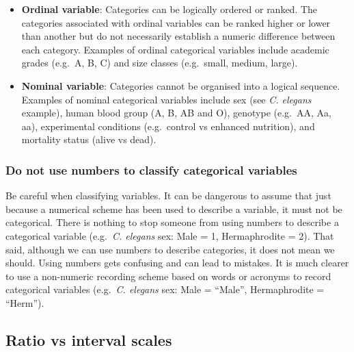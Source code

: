 \documentclass[
]{book}
\newenvironment{greybox}{
  \definecolor{shadecolor}{rgb}{0.95,0.95,0.95}  %
  \color{black}
  \begin{shaded}}
 {\end{shaded}}
\newenvironment{infobox}[1]
  {
  \begin{itemize}
  \renewcommand{\labelitemi}{
    \raisebox{-.7\height}[0pt][0pt]{
      {\setkeys{Gin}{width=3em,keepaspectratio}
        \texttt{[image: images/\#1]}}
    }
  }
  \setlength{\fboxsep}{1em}
  \begin{greybox}
  \item
  }
  {
  \end{greybox}
  \end{itemize}
  }
\begin{document}
\begin{itemize}
\item
  \textbf{Ordinal variable}: Categories can be logically ordered or ranked. The categories associated with ordinal variables can be ranked higher or lower than another but do not necessarily establish a numeric difference between each category. Examples of ordinal categorical variables include academic grades (e.g.~A, B, C) and size classes (e.g.~small, medium, large).
\item
  \textbf{Nominal variable}: Categories cannot be organised into a logical sequence. Examples of nominal categorical variables include sex (see \emph{C. elegans} example), human blood group (A, B, AB and O), genotype (e.g.~AA, Aa, aa), experimental conditions (e.g.~control vs enhanced nutrition), and mortality status (alive vs dead).
\end{itemize}

\begin{infobox}{warning}

\hypertarget{do-not-use-numbers-to-classify-categorical-variables}{%
\subsubsection*{Do not use numbers to classify categorical variables}\label{do-not-use-numbers-to-classify-categorical-variables}}

Be careful when classifying variables. It can be dangerous to assume that just because a numerical scheme has been used to describe a variable, it must not be categorical. There is nothing to stop someone from using numbers to describe a categorical variable (e.g.~\emph{C. elegans} sex: Male = 1, Hermaphrodite = 2). That said, although we can use numbers to describe categories, it does not mean we should. Using numbers gets confusing and can lead to mistakes. It is much clearer to use a non-numeric recording scheme based on words or acronyms to record categorical variables (e.g.~\emph{C. elegans} sex: Male = ``Male'', Hermaphrodite = ``Herm'').

\end{infobox}

\hypertarget{ratio-vs-interval-scales}{%
\subsection{Ratio vs interval scales}\label{ratio-vs-interval-scales}}
\end{document}
